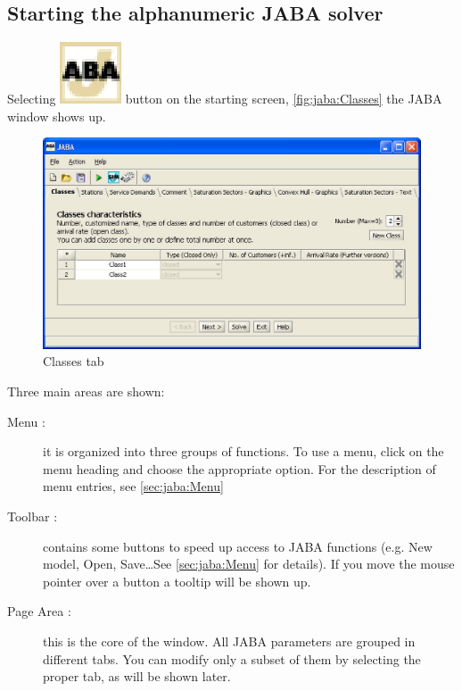 \subsection{Starting the alphanumeric JABA solver}
Selecting \includegraphics[scale=.5]{img/JABAIcon} button on the
starting screen, \autoref{fig:jaba:Classes} the JABA window shows up.
\begin{figure}[htbp]
    \begin{center}
        \includegraphics[scale=.5]{img/jaba/classes}
    \end{center}
    \caption{Classes tab}
    \label{fig:jaba:Classes}
\end{figure}

Three main areas are shown:
\begin{description}
\item[Menu :] it is organized into three groups of functions. To use a
menu, click on the menu heading and choose the appropriate option.
For the description of menu entries, see \autoref{sec:jaba:Menu}
\item[Toolbar :] contains some buttons to speed up access to JABA functions
(e.g. New model, Open, Save\dots See \autoref{sec:jaba:Menu} for
details). If you move the mouse pointer over a button a tooltip will
be shown up.
\item[Page Area :] this is the core of the window. All JABA parameters are grouped in
different tabs. You can modify only a subset of them by selecting
the proper tab, as will be shown later.
\end{description}

